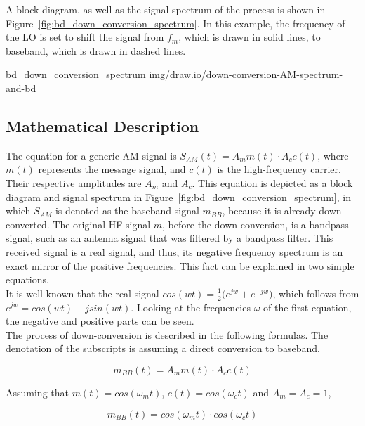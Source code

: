 A block diagram, as well as the signal spectrum of the process is shown in Figure~\ref{fig:bd_down_conversion_spectrum}. In this example, the frequency of the LO is set to shift the signal from $f_m$, which is drawn in solid lines, to baseband, which is drawn in dashed lines.

 {bd_down_conversion_spectrum} {img/draw.io/down-conversion-AM-spectrum-and-bd}

\subsection{Mathematical Description}

The equation for a generic AM signal is $ S_{AM}(t) = A_m m(t) \cdot A_c c(t) $, where $m(t)$ represents the message signal, and $c(t)$ is the high-frequency carrier.
Their respective amplitudes are $A_m$ and $A_c$.
This equation is depicted as a block diagram and signal spectrum in Figure~\ref{fig:bd_down_conversion_spectrum}, in which $S_{AM}$ is denoted as the baseband signal $m_{BB}$, because it is already down-converted.
The original HF signal $m$, before the down-conversion, is a bandpass signal, such as an antenna signal that was filtered by a bandpass filter.
This received signal is a real signal, and thus, its negative frequency spectrum is an exact mirror of the positive frequencies.
This fact can be explained in two simple equations.\\

It is well-known that the real signal $cos(wt) = \frac{1}{2} \Big( e^{jw} + e^{-jw} \Big)$, which follows from $e^{jw} = cos(wt)+jsin(wt)$.
Looking at the frequencies $\omega$ of the first equation, the negative and positive parts can be seen.\\

The process of down-conversion is described in the following formulas.
The denotation of the subscripts is assuming a direct conversion to baseband.

\begin{equation}
  m_{BB}(t) = A_m m(t) \cdot A_c c(t)
\end{equation}

\noindent
Assuming that $m(t) = cos(\omega_mt)$, $c(t) = cos(\omega_ct)$ and $A_m = A_c = 1$,

\begin{equation}
  m_{BB}(t) = cos(\omega_mt) \cdot cos(\omega_ct)
\end{equation}

